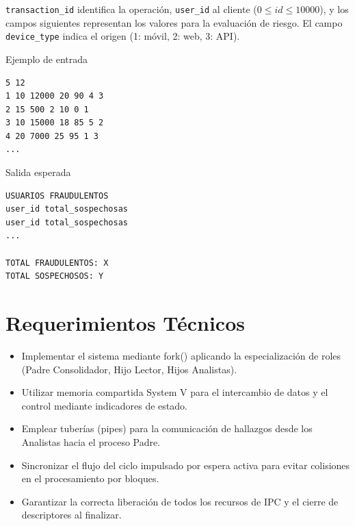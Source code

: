 \documentclass[12pt,a4paper]{article}
\begin{document}
\texttt{transaction\_id} identifica la operación, \texttt{user\_id} al cliente ($0 \le id \le 10000$), y los campos siguientes representan los valores para la evaluación de riesgo. El campo \texttt{device\_type} indica el origen (1: móvil, 2: web, 3: API).

\vspace{0.4cm}

\noindent
\begin{minipage}[t]{0.48\textwidth}
Ejemplo de entrada
\begin{lstlisting}[numbers=none, frame=single, backgroundcolor=\color{white}]
5 12
1 10 12000 20 90 4 3
2 15 500 2 10 0 1
3 10 15000 18 85 5 2
4 20 7000 25 95 1 3
...
\end{lstlisting}
\end{minipage}
\hfill
\begin{minipage}[t]{0.48\textwidth}
Salida esperada
\begin{lstlisting}[numbers=none, frame=single, backgroundcolor=\color{white}]
USUARIOS FRAUDULENTOS
user_id total_sospechosas
user_id total_sospechosas
...

TOTAL FRAUDULENTOS: X
TOTAL SOSPECHOSOS: Y
\end{lstlisting}
\end{minipage}

\section*{Requerimientos Técnicos}
\begin{itemize}
    \item Implementar el sistema mediante fork() aplicando la especialización de roles (Padre Consolidador, Hijo Lector, Hijos Analistas).
    \item Utilizar memoria compartida System V para el intercambio de datos y el control mediante indicadores de estado.
    \item Emplear tuberías (pipes) para la comunicación de hallazgos desde los Analistas hacia el proceso Padre.
    \item Sincronizar el flujo del ciclo impulsado por espera activa para evitar colisiones en el procesamiento por bloques.
    \item Garantizar la correcta liberación de todos los recursos de IPC y el cierre de descriptores al finalizar.
\end{itemize}
\end{document}
